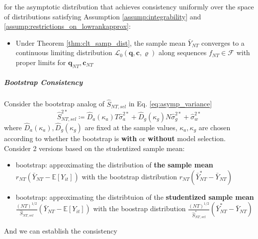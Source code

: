 \documentclass[twoside]{article}
\begin{document}
for the asymptotic distribution that achieves consistency uniformly over the space of distributions satisfying Assumption \ref{assump:integrability} and \ref{assump:restrictions_on_lowrankapprox}: 
\begin{itemize}
    \item Under Theorem \ref{thm:clt_samp_dist}, the sample mean $\bar{Y}_{NT}$ converges to a continuous limiting distribution $\mathcal{L}_0(\mathbf{q,c},\varrho)$ along sequences $f_{NT}\in \mathcal{F}$ with proper limits for $\mathbf{q}_{NT},\mathbf{c}_{NT}$
\end{itemize}

\subparagraph*{Bootstrap Consistency}
Consider the bootstrap analog of $\hat{S}_{NT,sel}$ in Eq. \ref{eq:asymp_variance}
\begin{equation*}
    \hat{S}^{2*}_{NT,sel}\coloneq \hat{D}_a(\kappa_a)T\hat{\sigma}^{2*}_a + \hat{D}_g (\kappa_g) N\hat{\sigma}^{2*}_g + \hat{\sigma}^{2*}_w
\end{equation*}
where $\hat{D}_a(\kappa_a),\hat{D}_g(\kappa_g)$ are fixed at the sample values, $\kappa_a,\kappa_g$ are chosen according to whether the bootstrap is \textbf{with} or \textbf{without} model selection. Consider 2 versions based on the studentized sample mean:
\begin{itemize}
    \item {} bootstrap: approximating the distribution of \textbf{the sample mean} $r_{NT}\left(\bar{Y}_{NT}-\mathbb{E}\left[Y_{it}\right]\right)$ with the bootstrap distribution $r_{NT}\left(\bar{Y}^*_{NT}-\bar{Y}_{NT}\right)$
    \item {} bootstrap: approximating the distribtuion of the \textbf{studentized sample mean} $\frac{(NT)^{1/2}}{\hat{S}_{NT,sel}}\left(\bar{Y}_{NT}-\mathbb{E}\left[Y_{it}\right]\right)$ with the boostrap distribution $\frac{(NT)^{1/2}}{\hat{S}^*_{NT,sel}}\left(\bar{Y}^*_{NT}- \bar{Y}_{NT}\right)$
\end{itemize}
And we can establish the consistency
\end{document}
